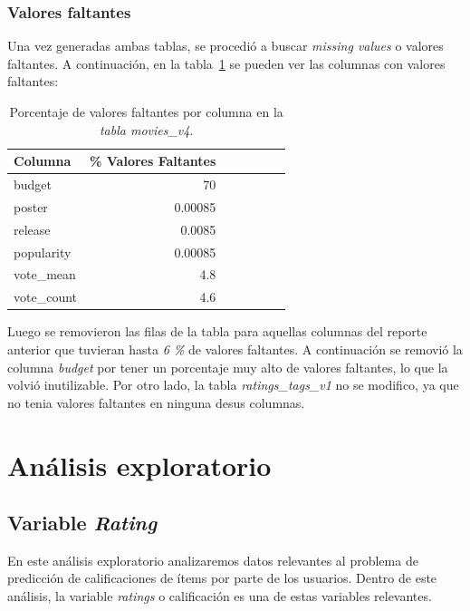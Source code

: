 \documentclass[11pt,a4paper,twoside]{thesis}
\begin{document}
\subsubsection*{Valores faltantes}

Una vez generadas ambas tablas, se procedió a buscar \textit{missing values} o
valores faltantes. A continuación, en la tabla~\ref{table:tab} se pueden ver
las columnas con valores faltantes:

\begin{table}[h!]
	\centering
	\footnotesize
	\begin{tabular}{lrrrrrr}
		\hline
		Columna     & \% Valores Faltantes \\
		\hline
		budget      & 70                   \\
		poster      & 0.00085              \\
		release     & 0.0085               \\
		popularity  & 0.00085              \\
		vote\_mean  & 4.8                  \\
		vote\_count & 4.6                  \\
		\hline
	\end{tabular}
	\caption{Porcentaje de valores faltantes por columna en la \textit{tabla movies\_v4}.}
	\label{table:tab}
\end{table}

Luego se removieron las filas de la tabla para aquellas columnas del reporte
anterior que tuvieran hasta \textit{6 \%} de valores faltantes. A continuación
se removió la columna \textit{budget} por tener un porcentaje muy alto de
valores faltantes, lo que la volvió inutilizable. Por otro lado, la tabla
\textit{ratings\_tags\_v1} no se modifico, ya que no tenia valores faltantes en
ninguna desus columnas.

\clearpage

\section{Análisis exploratorio}

\subsection{Variable \textit{Rating}}

En este análisis exploratorio analizaremos datos relevantes al problema de
predicción de calificaciones de ítems por parte de los usuarios. Dentro de este
análisis, la variable \textit{ratings} o calificación es una de estas variables
relevantes.
\end{document}
